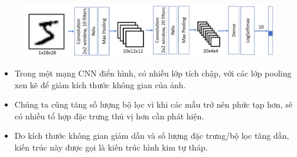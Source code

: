 \documentclass{book}
\begin{document}
\begin{figure}[H]
    \centering
    \includegraphics[width=1.0\linewidth]{images/cnn1.png}
    \label{fig:cnn1}
\end{figure}
\begin{itemize}
    \item Trong một mạng CNN điển hình, có nhiều lớp tích chập, với các lớp pooling xen kẽ để giảm kích thước không gian của ảnh.
    \item Chúng ta cũng tăng số lượng bộ lọc vì khi các mẫu trở nên phức tạp hơn, sẽ có nhiều tổ hợp đặc trưng thú vị hơn cần phát hiện.
    \item Do kích thước không gian giảm dần và số lượng đặc trưng/bộ lọc tăng dần, kiến trúc này được gọi là kiến trúc hình kim tự tháp.
\end{itemize}
\end{document}
